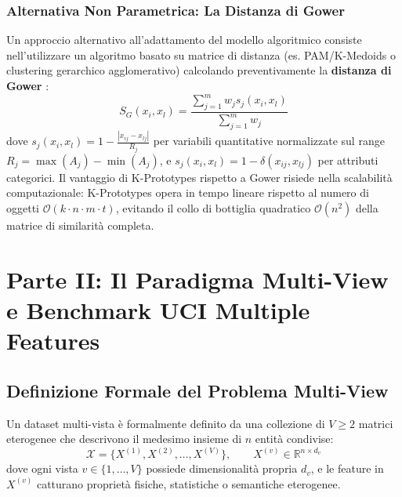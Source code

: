 \subsubsection{Alternativa Non Parametrica: La Distanza di Gower}
Un approccio alternativo all'adattamento del modello algoritmico consiste nell'utilizzare un algoritmo basato su matrice di distanza (es. PAM/K-Medoids o clustering gerarchico agglomerativo) calcolando preventivamente la \textbf{distanza di Gower} \cite{gower1971}:
\begin{equation}
    S_{G}(x_i, x_l) = \frac{\sum_{j=1}^m w_j s_{j}(x_i, x_l)}{\sum_{j=1}^m w_j}
\end{equation}
dove $s_j(x_i, x_l) = 1 - \frac{|x_{ij} - x_{lj}|}{R_j}$ per variabili quantitative normalizzate sul range $R_j = \max(A_j) - \min(A_j)$, e $s_j(x_i, x_l) = 1 - \delta(x_{ij}, x_{lj})$ per attributi categorici. Il vantaggio di K-Prototypes rispetto a Gower risiede nella scalabilità computazionale: K-Prototypes opera in tempo lineare rispetto al numero di oggetti $\mathcal{O}(k \cdot n \cdot m \cdot t)$, evitando il collo di bottiglia quadratico $\mathcal{O}(n^2)$ della matrice di similarità completa.

\FloatBarrier
\section{Parte II: Il Paradigma Multi-View e Benchmark UCI Multiple Features}
\label{sec:lab-multiview-data}

\FloatBarrier
\subsection{Definizione Formale del Problema Multi-View}
\label{subsec:lab-mv-definition}

\begin{definition}
Un dataset multi-vista è formalmente definito da una collezione di $V \ge 2$ matrici eterogenee che descrivono il medesimo insieme di $n$ entità condivise:
\begin{equation}
    \mathcal{X} = \big\{ X^{(1)}, X^{(2)}, \dots, X^{(V)} \big\}, \qquad X^{(v)} \in \mathbb{R}^{n \times d_v}
\end{equation}
dove ogni vista $v \in \{1, \dots, V\}$ possiede dimensionalità propria $d_v$, e le feature in $X^{(v)}$ catturano proprietà fisiche, statistiche o semantiche eterogenee.
\end{definition}


